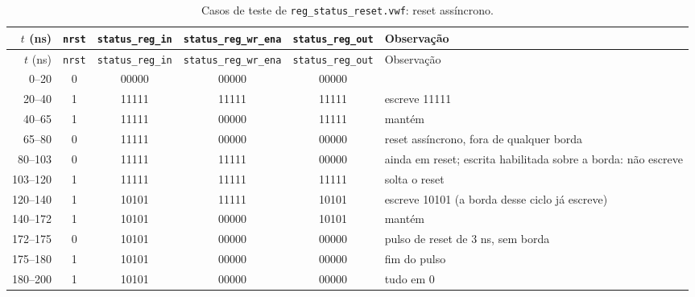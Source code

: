 {\scriptsize\setlength{\tabcolsep}{3pt}
\begin{longtable}{rccccp{4.4cm}}
\caption{Casos de teste de \texttt{reg\_status\_reset.vwf}: reset assíncrono.}
\label{tab:caso-reg-status-reset}\\
\hline $t$ (ns) & \texttt{nrst} & \texttt{status\_reg\_in} & \texttt{status\_reg\_wr\_ena} & \texttt{status\_reg\_out} & Observação \\ \hline \endfirsthead
\hline $t$ (ns) & \texttt{nrst} & \texttt{status\_reg\_in} & \texttt{status\_reg\_wr\_ena} & \texttt{status\_reg\_out} & Observação \\ \hline \endhead
0--20 & 0 & 00000 & 00000 & 00000 &  \\
20--40 & 1 & 11111 & 11111 & 11111 & escreve 11111 \\
40--65 & 1 & 11111 & 00000 & 11111 & mantém \\
65--80 & 0 & 11111 & 00000 & 00000 & reset assíncrono, fora de qualquer borda \\
80--103 & 0 & 11111 & 11111 & 00000 & ainda em reset; escrita habilitada sobre a borda: não escreve \\
103--120 & 1 & 11111 & 11111 & 11111 & solta o reset \\
120--140 & 1 & 10101 & 11111 & 10101 & escreve 10101 (a borda desse ciclo já escreve) \\
140--172 & 1 & 10101 & 00000 & 10101 & mantém \\
172--175 & 0 & 10101 & 00000 & 00000 & pulso de reset de 3 ns, sem borda \\
175--180 & 1 & 10101 & 00000 & 00000 & fim do pulso \\
180--200 & 1 & 10101 & 00000 & 00000 & tudo em 0 \\
\hline
\end{longtable}}
\vspace{-0.9cm}
